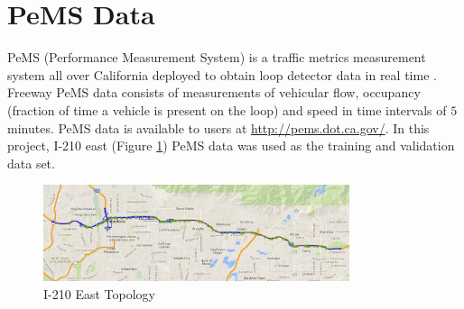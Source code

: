 \documentclass[11pt]{article}
\begin{document}
\section*{PeMS Data} 
PeMS (Performance Measurement System) is a traffic metrics measurement system all over California deployed to obtain loop detector data in real time \cite{PemsPravin}. Freeway PeMS data consists of measurements of vehicular flow, occupancy (fraction of time a vehicle is present on the loop) and speed in time intervals of $5$ minutes. PeMS data is available to users at \url{http://pems.dot.ca.gov/}. In this project, I-210 east (Figure \ref{fig:210}) PeMS data was used as the training and validation data set. 
\begin{figure}[p]
    \centering
    \includegraphics[width=0.8\textwidth]{210.png}
    \caption{I-210 East Topology}
    \label{fig:210}
\end{figure}  





\end{document}
